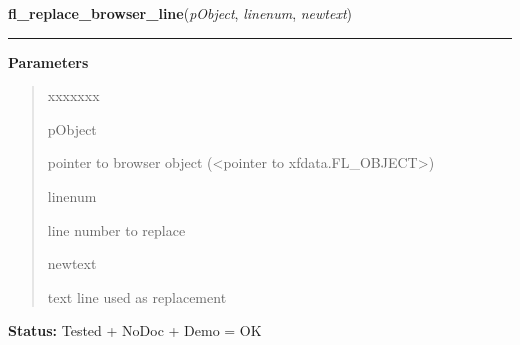 \hspace{.8\funcindent}\begin{boxedminipage}{\funcwidth}

    \raggedright \textbf{fl\_replace\_browser\_line}(\textit{pObject}, \textit{linenum}, \textit{newtext})

    \vspace{-1.5ex}

    \rule{\textwidth}{0.5\fboxrule}
\setlength{\parskip}{2ex}
\setlength{\parskip}{1ex}
      \textbf{Parameters}
      \vspace{-1ex}

      \begin{quote}
        \begin{Ventry}{xxxxxxx}

          \item[pObject]

          pointer to browser object ({\textless}pointer to 
          xfdata.FL\_OBJECT{\textgreater})

          \item[linenum]

          line number to replace

          \item[newtext]

          text line used as replacement

        \end{Ventry}

      \end{quote}

\textbf{Status:} Tested + NoDoc + Demo = OK



    \end{boxedminipage}

    \label{xformslib:library:fl_get_browser_line}

    \vspace{0.5ex}

